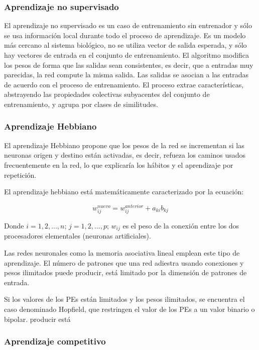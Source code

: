 \subsubsection{Aprendizaje no supervisado}

El aprendizaje no supervisado es un caso de entrenamiento sin entrenador y sólo se usa información local durante todo el proceso de aprendizaje. Es un modelo más cercano al sistema biológico, no se utiliza vector de salida
esperada, y sólo hay vectores de entrada en el conjunto de entrenamiento. El algoritmo modifica los pesos de forma que las salidas sean consistentes, es decir, que a entradas muy parecidas, la red compute la misma salida. 
Las salidas se asocian a las entradas de acuerdo con el proceso de entrenamiento. El proceso extrae características, abstrayendo las propiedades colectivas subyacentes del conjunto de entrenamiento, y agrupa por clases 
de similitudes.

\subsubsection{Aprendizaje Hebbiano}

El aprendizaje Hebbiano propone que los pesos de la red se incrementan si las neuronas origen y destino están activadas, es decir, refueza los caminos usados frecuentemente en la red, lo que explicaría los
hábitos y el aprendizaje por repetición.

El aprendizaje hebbiano está matemáticamente caracterizado por la ecuación:

$$ w_{ij}^{nuevo} = w_{ij}^{anterior} + a_{ki}b_{kj} $$

Donde $i = 1,2,...,n$; $j=1,2,...,p$; $w_{ij}$ es el peso de la conexión entre los dos procesadores elementales (neuronas artificiales).

Las redes neuronales como la memoria asociativa lineal emplean este tipo de aprendizaje. El número de patrones que una red adiestra usando conexiones y pesos ilimitados puede producir, está limitado por la dimensión de 
patrones de entrada.

Si los valores de los PEs están limitados y los pesos ilimitados, se encuentra el caso denominado Hopfield, que restringen el valor de los PEs a un valor binario o bipolar.
producir está

\subsubsection{Aprendizaje competitivo}


